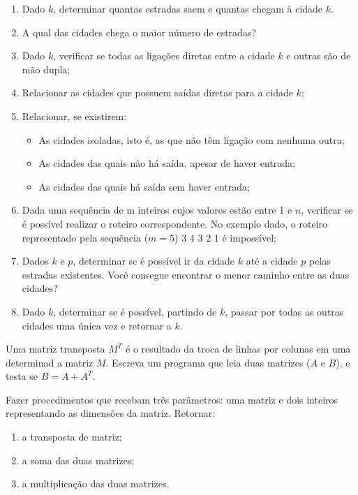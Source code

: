 \begin{enumerate}
\item Dado $k$, determinar quantas estradas saem e quantas chegam à cidade $k$.
\item  A qual das cidades chega o maior número de estradas?
\item Dado $k$, verificar se todas as ligações diretas entre a cidade $k$ e 
   outras são de mão dupla;
\item  Relacionar as cidades que possuem saídas diretas para a cidade $k$;
\item Relacionar, se existirem:
  \begin{itemize}
   \item As cidades isoladas, isto é, as que não têm ligação com nenhuma outra;
   \item As cidades das quais não há saída, apesar de haver entrada;
   \item As cidades das quais há saída sem haver entrada;
  \end{itemize}
\item Dada uma sequência de m inteiros cujos valores estão entre 1 e $n$,
   verificar se é possível realizar o roteiro correspondente. No 
   exemplo dado, o roteiro representado pela sequência ($m=5$) 3 4 3 2 1
   é impossível;
\item Dados $k$ e $p$, determinar se é possível ir da cidade $k$ até a cidade 
   $p$
   pelas estradas existentes. Você consegue encontrar o menor caminho
   entre as duas cidades?
\item Dado $k$, determinar se é possível, partindo de $k$, passar por todas as
   outras cidades uma única vez e retornar a $k$.
\end{enumerate}

\item Uma matriz transposta $M^T$ é o resultado da troca de linhas por colunas em uma determinad
a matriz $M$.
Escreva um programa que leia duas matrizes ($A$ e $B$), e testa se $B = A +
 A^T$.

\item Fazer procedimentos que recebam três parâmetros:  uma matriz e dois
   inteiros representando as dimensões da matriz. Retornar: 
  \begin{enumerate} 
    \item a transposta de matriz; 
    \item a soma das duas matrizes;
    \item a multiplicação das duas matrizes.
  \end{enumerate} 

